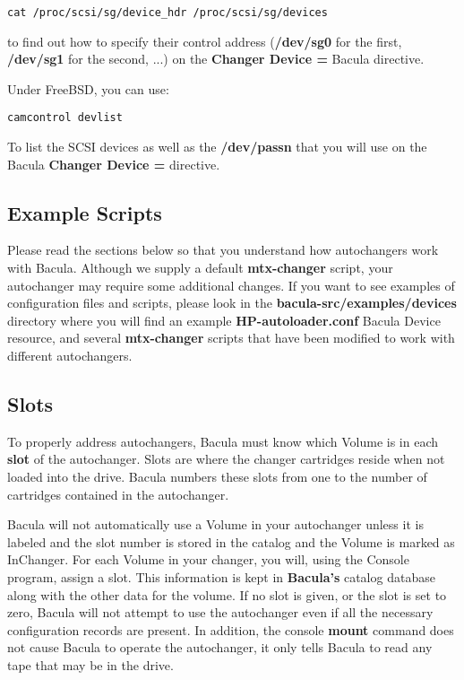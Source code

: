 \footnotesize
\begin{verbatim}
cat /proc/scsi/sg/device_hdr /proc/scsi/sg/devices
\end{verbatim}
\normalsize

to find out how to specify their control address ({\bf /dev/sg0} for the
first, {\bf /dev/sg1} for the second, ...) on the {\bf Changer Device = }
Bacula directive. 

Under FreeBSD, you can use: 

\footnotesize
\begin{verbatim}
camcontrol devlist
\end{verbatim}
\normalsize

To list the SCSI devices as well as the {\bf /dev/passn} that you will use on
the Bacula {\bf Changer Device = } directive. 

\label{scripts}

\subsection*{Example Scripts}

Please read the sections below so that you understand how autochangers work
with Bacula. Although we supply a default {\bf mtx-changer} script, your
autochanger may require some additional changes. If you want to see examples
of configuration files and scripts, please look in the {\bf
\lt{}bacula-src\gt{}/examples/devices} directory where you will find an
example {\bf HP-autoloader.conf} Bacula Device resource, and several {\bf
mtx-changer} scripts that have been modified to work with different
autochangers. 

\label{Slots}

\subsection*{Slots}

To properly address autochangers, Bacula must know which Volume is in each
{\bf slot} of the autochanger. Slots are where the changer cartridges reside
when not loaded into the drive. Bacula numbers these slots from one to the
number of cartridges contained in the autochanger. 

Bacula will not automatically use a Volume in your autochanger unless it is
labeled and the slot number is stored in the catalog and the Volume is marked
as InChanger. For each Volume in your
changer, you will, using the Console program, assign a slot. This information
is kept in {\bf Bacula's} catalog database along with the other data for the
volume. If no slot is given, or the slot is set to zero, Bacula will not
attempt to use the autochanger even if all the necessary configuration records
are present. In addition, the console {\bf mount} command does not cause
Bacula to operate the autochanger, it only tells Bacula to read any tape that
may be in the drive. 

